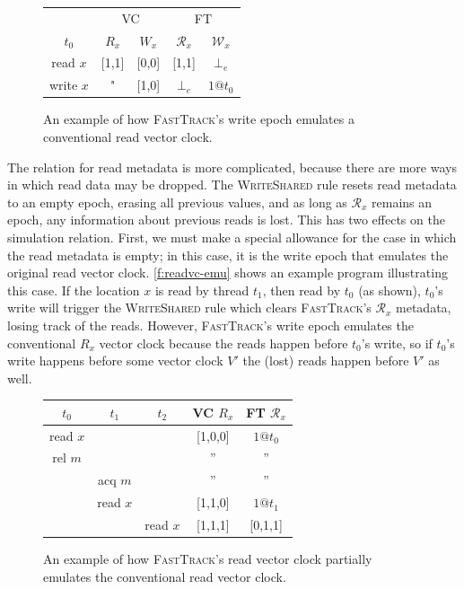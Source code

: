 \documentclass[preprint, 10pt]{sigplanconf}
\newcommand{\Tid}{t}
\newcommand{\Address}{x}
\newcommand{\Lock}{m}
\newcommand{\VC}{V}
\newcommand{\VCFont}{}
\newcommand{\ReadVC}[1]{\VCFont{R}_{#1}}
\newcommand{\WriteVC}[1]{\VCFont{W}_{#1}}
\newcommand{\FT}{\textsc{FastTrack}\xspace}
\newcommand{\Rule}[1]{\textsc{#1}}
\newcommand{\EmptyEpoch}{\bot_e}
\begin{document}
\begin{figure}[h]
\centering
\begin{tabular}{c|cc|cc|}
& \multicolumn{2}{c}{VC} & \multicolumn{2}{c}{FT} \\
$\Tid_0$ & $\ReadVC{\Address}$ & $\WriteVC{\Address}$ & $\mathcal{R}_{\Address}$ & $\mathcal{W}_{\Address}$ \\
\hline
read $\Address$ & [1,1] & [0,0] & [1,1] & $\EmptyEpoch$ \\
write $\Address$ & " & [1,0] & $\EmptyEpoch$ & $1@t_0$ \\
\end{tabular}
\caption{An example of how \FT's write epoch emulates a conventional read vector clock.}
\label{f:readvc-emu}
\end{figure}

The relation for read metadata is more complicated, because there are more ways in which read data may be dropped. The \Rule{WriteShared} rule resets read metadata to an empty epoch, erasing all previous values, and as long as $\mathcal{R}_x$ remains an epoch, any information about previous reads is lost. This has two effects on the simulation relation. First, we must make a special allowance for the case in which the read metadata is empty; in this case, it is the write epoch that emulates the original read vector clock. \autoref{f:readvc-emu} shows an example program illustrating this case. If the location $\Address$ is read by thread $\Tid_1$, then read by $\Tid_0$ (as shown), $\Tid_0$'s write will trigger the \Rule{WriteShared} rule which clears \FT's $\mathcal{R}_x$ metadata, losing track of the reads. However, \FT's write epoch emulates the conventional $R_x$ vector clock because the reads happen before $\Tid_0$'s write, so if $\Tid_0$'s write happens before some vector clock $\VC'$ the (lost) reads happen before $\VC'$ as well.

\begin{figure}[h]
\centering
\begin{tabular}{ccc|c|c|}
$\Tid_0$ & $\Tid_1$ & $\Tid_2$ & VC $\ReadVC{\Address}$ & FT $\mathcal{R}_{\Address}$ \\
\hline
read $\Address$ & &      & [1,0,0] & $1@t_0$\\
rel $\Lock$ & &      &''&''\\
& acq $\Lock$ &      &''&''\\
& read $\Address$ &      &[1,1,0]&$1@t_1$\\
& & read $\Address$      &[1,1,1]&[0,1,1]\\
\end{tabular}
\caption{An example of how \FT's read vector clock partially emulates the conventional read vector clock.}
\label{f:partial-emu}
\end{figure}
\end{document}
